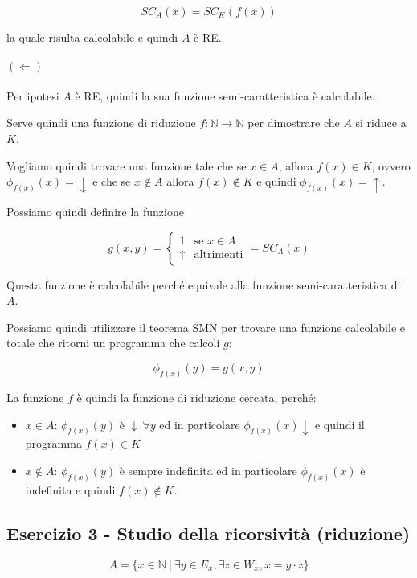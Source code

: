 $$
SC_A(x) = SC_K(f(x))
$$ 

la quale risulta calcolabile e quindi $A$ è RE.

\paragraph{$(\Leftarrow)$}

Per ipotesi $A$ è RE, quindi la sua funzione semi-caratteristica è calcolabile.

Serve quindi una funzione di riduzione $f : \mathbb{N} \rightarrow \mathbb{N}$ per dimostrare che $A$ si riduce a $K$.

Vogliamo quindi trovare una funzione tale che se $x \in A$, allora $f(x) \in K$, ovvero $\phi_{f(x)}(x) = \downarrow$ e che se $x \notin A$ allora $f(x) \notin K$ e quindi $\phi_{f(x)}(x) = \uparrow $.

Possiamo quindi definire la funzione

$$
g(x,y) = \begin{cases}
1 &\text{se } x \in A \\
\uparrow &\text{altrimenti}
\end{cases} = SC_A(x)
$$

Questa funzione è calcolabile perché equivale alla funzione semi-caratteristica di $A$. 

Possiamo quindi utilizzare il teorema SMN per trovare una funzione calcolabile e totale che ritorni un programma che calcoli $g$:

$$
\phi_{f(x)}(y) = g(x,y)
$$ 

La funzione $f$ è quindi la funzione di riduzione cercata, perché:

\begin{itemize}
	\item $x \in A$: $\phi_{f(x)}(y)$ è $\downarrow \: \forall y$ ed in particolare $\phi_{f(x)}(x) \downarrow$ e quindi il programma $f(x) \in K$
	\item $x \notin A$: $\phi_{f(x)}(y)$ è sempre indefinita ed in particolare $\phi_{f(x)}(x) $ è indefinita e quindi $f(x) \notin K$.
\end{itemize}


\subsection{Esercizio 3 - Studio della ricorsività (riduzione)}

$$
A = \{ x \in \mathbb{N} \:|\: \exists y \in E_x, \exists z \in W_x, x = y \cdot z  \}
$$

